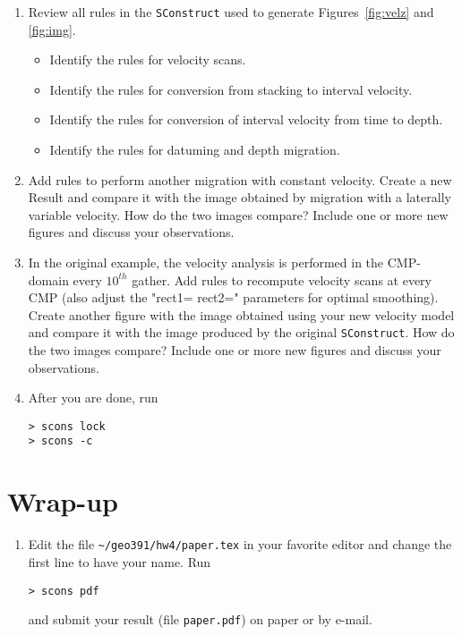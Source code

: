 

\begin{enumerate}

\item
Review all rules in the \texttt{SConstruct} used to generate
Figures~\ref{fig:velz} and \ref{fig:img}.
\begin{itemize}
\item Identify the rules for velocity scans.
\item Identify the rules for conversion from stacking
to interval velocity.
\item Identify the rules for conversion of interval velocity
from time to depth.
\item Identify the rules for datuming and depth migration.
\end{itemize}

\item
Add rules to perform another migration with constant velocity.
Create a new Result and compare it with the image
obtained by migration with a laterally variable velocity.
How do the two images compare?
Include one or more new figures and discuss your 
observations.


\item
In the original example, the velocity analysis
is performed in the CMP-domain every $10^{th}$ gather.
Add rules to recompute velocity scans at every CMP
(also adjust the "rect1= rect2=" parameters for optimal 
smoothing). 
Create another figure with the image obtained using
your new velocity model and compare it with the image
produced by the original \texttt{SConstruct}.
How do the two images compare?
Include one or more new figures and discuss your 
observations.


\item After you are done, run

\begin{verbatim}
> scons lock
> scons -c
\end{verbatim} 
  
\end{enumerate}


\section{Wrap-up}

\begin{enumerate}  

\item 
Edit the file
\verb#~/geo391/hw4/paper.tex# in your favorite editor and 
change the first line to have your name. Run
\begin{verbatim}
> scons pdf
\end{verbatim}
and submit your result (file \texttt{paper.pdf}) on paper 
or by e-mail.

\end{enumerate}
